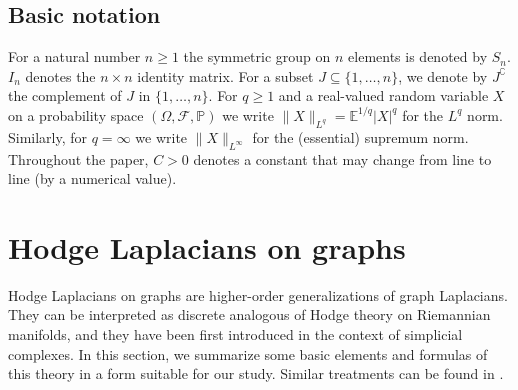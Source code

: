 \documentclass[10pt]{article}
\theoremstyle{plain}
\theoremstyle{definition}
\theoremstyle{remark}
\begin{document}
\subsection*{Basic notation}
For a natural number $n\geq 1$ the symmetric group on $n$ elements is denoted by $S_n$. $I_n$ denotes the $n\times n$ identity matrix. For a subset $J\subseteq \{1,\dots,n\}$, we denote by $J^{\complement}$ the complement of $J$ in $\{1,\dots,n\}$. For $q\geq 1$ and a real-valued random variable $X$ on a probability space $(\Omega,\mathcal{F},\mathbb{P})$ we write $\|X\|_{L^q}=\mathbb{E}^{1/q}|X|^q$ for the $L^q$ norm. Similarly, for $q=\infty$ we write $\|X\|_{L^\infty}$ for the (essential) supremum norm. Throughout the paper, $C>0$ denotes a constant that may change from line to line (by a numerical value).


\section{Hodge Laplacians on graphs}
\label{section:HodgeLaplacian}
Hodge Laplacians on graphs are higher-order generalizations of graph Laplacians. They can be interpreted as discrete analogous of Hodge theory on Riemannian manifolds, and they have been first introduced in the context of simplicial complexes. In this section, we summarize some basic elements and formulas of this theory in a form suitable for our study. Similar treatments can be found in \cite{Smale12,Lim20}.
\end{document}
